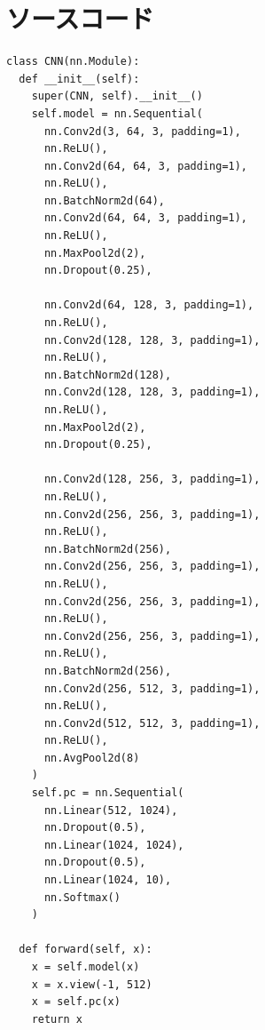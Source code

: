 \documentclass[twocolumn]{jarticle}     %
\begin{document}
\section{ソースコード}

\begin{lstlisting}[caption=cnn,label=model_cnn]
class CNN(nn.Module):
  def __init__(self):
    super(CNN, self).__init__()
    self.model = nn.Sequential(
      nn.Conv2d(3, 64, 3, padding=1),
      nn.ReLU(),
      nn.Conv2d(64, 64, 3, padding=1),
      nn.ReLU(),
      nn.BatchNorm2d(64),
      nn.Conv2d(64, 64, 3, padding=1),
      nn.ReLU(),
      nn.MaxPool2d(2),
      nn.Dropout(0.25),

      nn.Conv2d(64, 128, 3, padding=1),
      nn.ReLU(),
      nn.Conv2d(128, 128, 3, padding=1),
      nn.ReLU(),
      nn.BatchNorm2d(128),
      nn.Conv2d(128, 128, 3, padding=1),
      nn.ReLU(),
      nn.MaxPool2d(2),
      nn.Dropout(0.25),

      nn.Conv2d(128, 256, 3, padding=1),
      nn.ReLU(),
      nn.Conv2d(256, 256, 3, padding=1),
      nn.ReLU(),
      nn.BatchNorm2d(256),
      nn.Conv2d(256, 256, 3, padding=1),
      nn.ReLU(),
      nn.Conv2d(256, 256, 3, padding=1),
      nn.ReLU(),
      nn.Conv2d(256, 256, 3, padding=1),
      nn.ReLU(),
      nn.BatchNorm2d(256),
      nn.Conv2d(256, 512, 3, padding=1),
      nn.ReLU(),
      nn.Conv2d(512, 512, 3, padding=1),
      nn.ReLU(),
      nn.AvgPool2d(8)
    )
    self.pc = nn.Sequential(
      nn.Linear(512, 1024),
      nn.Dropout(0.5),
      nn.Linear(1024, 1024),
      nn.Dropout(0.5),
      nn.Linear(1024, 10),
      nn.Softmax()
    )

  def forward(self, x):
    x = self.model(x)
    x = x.view(-1, 512)
    x = self.pc(x)
    return x
\end{lstlisting}


	
	
\end{document}
